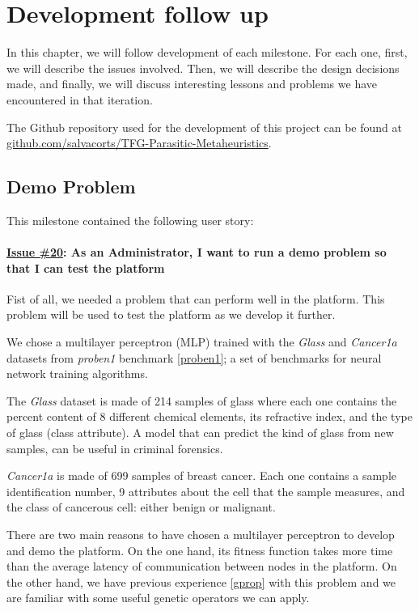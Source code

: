 \chapter{Development follow up}
In this chapter, we will follow development of each milestone. For each one, first, we will describe the issues involved. Then, we will describe the design decisions made, and finally, we will discuss interesting lessons and problems we have encountered in that iteration.

The Github repository used for the development of this project can be found at \href{https://github.com/salvacorts/TFG-Parasitic-Metaheuristics}{github.com/salvacorts/TFG-Parasitic-Metaheuristics}.

\section{Demo Problem}
This milestone contained the following user story:

\subsubsection*{\href{https://github.com/salvacorts/TFG-Parasitic-Metaheuristics/issues/20}{Issue \#20}: As an Administrator, I want to run a demo problem so that I can test the platform} 

Fist of all, we needed a problem that can perform well in the platform. This problem will be used to test the platform as we develop it further.

We chose a multilayer perceptron (MLP) trained with the \textit{Glass} and \textit{Cancer1a} datasets from \textit{proben1} benchmark \ref{proben1}; a set of benchmarks for neural network training algorithms.

The \textit{Glass} dataset is made of 214 samples of glass where each one contains the percent content of 8 different chemical elements, its refractive index, and the type of glass (class attribute). A model that can predict the kind of glass from new samples, can be useful in criminal forensics.

\textit{Cancer1a} is made of 699 samples of breast cancer. Each one contains a sample identification number, 9 attributes about the cell that the sample measures, and the class of cancerous cell: either benign or malignant.

There are two main reasons to have chosen a multilayer perceptron to develop and demo the platform. On the one hand, its fitness function takes more time than the average latency of communication between nodes in the platform. On the other hand, we have previous experience \ref{gprop} with this problem and we are familiar with some useful genetic operators we can apply.

